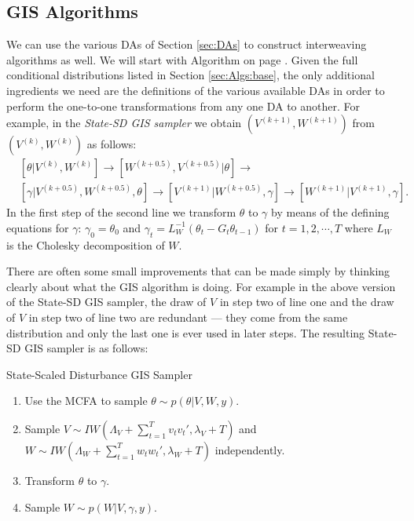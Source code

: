 \documentclass[12pt]{article}
\begin{document}
\subsection{GIS Algorithms}\label{sec:Algs:GIS}
We can use the various DAs of Section \ref{sec:DAs} to construct interweaving algorithms as well. We will start with Algorithm  on page \pageref{alg:eGIS}. Given the full conditional distributions listed in Section \ref{sec:Algs:base}, the only additional ingredients we need are the definitions of the various available DAs in order to perform the one-to-one transformations from any one DA to another. For example, in the {\it State-SD GIS sampler} we obtain $(V^{(k+1)},W^{(k+1)})$ from $(V^{(k)},W^{(k)})$ as follows:
\begin{align*}
&[\theta|V^{(k)},W^{(k)}] \to [W^{(k+0.5)},V^{(k+0.5)}|\theta] \to\\
&[\gamma|V^{(k+0.5)},W^{(k+0.5)},\theta] \to [V^{(k+1)}|W^{(k+0.5)},\gamma] \to [W^{(k+1)}|V^{(k+1)},\gamma].
\end{align*}
In the first step of the second line we transform $\theta$ to $\gamma$ by means of the defining equations for $\gamma$: $\gamma_0=\theta_0$ and $\gamma_t = L_W^{-1}(\theta_t - G_t\theta_{t-1})$ for $t=1,2,\cdots,T$ where $L_W$ is the Cholesky decomposition of $W$.

There are often some small improvements that can be made simply by thinking clearly about what the GIS algorithm is doing. For example in the above version of the State-SD GIS sampler, the draw of $V$ in step two of line one and the draw of $V$ in step two of line two are redundant --- they come from the same distribution and only the last one is ever used in later steps. The resulting State-SD GIS sampler is as follows:
\begin{alg*}State-Scaled Disturbance GIS Sampler
\label{alg:DLMstateerror}
\begin{enumerate}
\item Use the MCFA to sample $\theta \sim p(\theta|V,W,y)$.
\item Sample $V \sim IW\left(\Lambda_V + \sum_{t=1}^Tv_tv_t',\lambda_V + T\right)$ and $W \sim IW\left(\Lambda_W + \sum_{t=1}^Tw_tw_t',\lambda_{W} + T\right)$ independently.
\item Transform $\theta$ to $\gamma$.
\item Sample $W \sim p(W|V,\gamma,y)$.
\end{enumerate}
\end{alg*}\noindent
\end{document}
